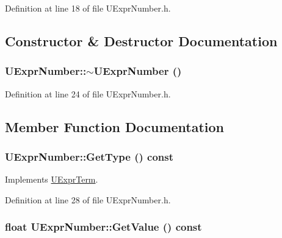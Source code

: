 Definition at line 18 of file UExprNumber.h.

\subsection{Constructor \& Destructor Documentation}
\hypertarget{class_u_expr_number_8ee536f5a9154d90d0a0a6710ca8a6f0}{
\subsubsection[{$\sim$UExprNumber}]{\setlength{\rightskip}{0pt plus 5cm}UExprNumber::$\sim$UExprNumber ()}}
\label{class_u_expr_number_8ee536f5a9154d90d0a0a6710ca8a6f0}




Definition at line 24 of file UExprNumber.h.

\subsection{Member Function Documentation}
\hypertarget{class_u_expr_number_e0235cdd37c30e7cfa51bb3f8a739e05}{
\subsubsection[{GetType}]{ UExprNumber::GetType () const}}
\label{class_u_expr_number_e0235cdd37c30e7cfa51bb3f8a739e05}




Implements \hyperlink{class_u_expr_term_fc66ae4dfe6a112d107183840d753562}{UExprTerm}.

Definition at line 28 of file UExprNumber.h.\hypertarget{class_u_expr_number_bbbd099fb6900e6f749774b37599a64b}{
\subsubsection[{GetValue}]{\setlength{\rightskip}{0pt plus 5cm}float UExprNumber::GetValue () const}}
\label{class_u_expr_number_bbbd099fb6900e6f749774b37599a64b}





